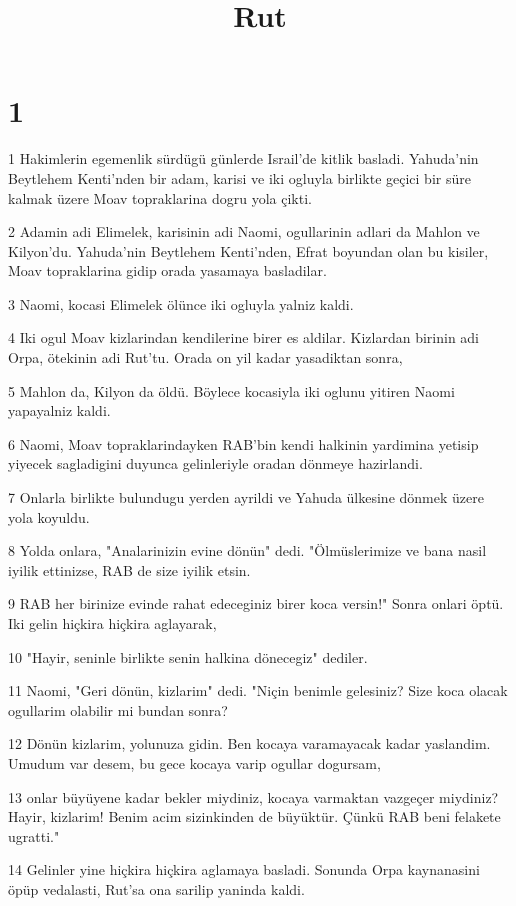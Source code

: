 

\title{Rut}


\chapter{1}

\par 1 Hakimlerin egemenlik sürdügü günlerde Israil'de kitlik basladi. Yahuda'nin Beytlehem Kenti'nden bir adam, karisi ve iki ogluyla birlikte geçici bir süre kalmak üzere Moav topraklarina dogru yola çikti.
\par 2 Adamin adi Elimelek, karisinin adi Naomi, ogullarinin adlari da Mahlon ve Kilyon'du. Yahuda'nin Beytlehem Kenti'nden, Efrat boyundan olan bu kisiler, Moav topraklarina gidip orada yasamaya basladilar.
\par 3 Naomi, kocasi Elimelek ölünce iki ogluyla yalniz kaldi.
\par 4 Iki ogul Moav kizlarindan kendilerine birer es aldilar. Kizlardan birinin adi Orpa, ötekinin adi Rut'tu. Orada on yil kadar yasadiktan sonra,
\par 5 Mahlon da, Kilyon da öldü. Böylece kocasiyla iki oglunu yitiren Naomi yapayalniz kaldi.
\par 6 Naomi, Moav topraklarindayken RAB'bin kendi halkinin yardimina yetisip yiyecek sagladigini duyunca gelinleriyle oradan dönmeye hazirlandi.
\par 7 Onlarla birlikte bulundugu yerden ayrildi ve Yahuda ülkesine dönmek üzere yola koyuldu.
\par 8 Yolda onlara, "Analarinizin evine dönün" dedi. "Ölmüslerimize ve bana nasil iyilik ettinizse, RAB de size iyilik etsin.
\par 9 RAB her birinize evinde rahat edeceginiz birer koca versin!" Sonra onlari öptü. Iki gelin hiçkira hiçkira aglayarak,
\par 10 "Hayir, seninle birlikte senin halkina dönecegiz" dediler.
\par 11 Naomi, "Geri dönün, kizlarim" dedi. "Niçin benimle gelesiniz? Size koca olacak ogullarim olabilir mi bundan sonra?
\par 12 Dönün kizlarim, yolunuza gidin. Ben kocaya varamayacak kadar yaslandim. Umudum var desem, bu gece kocaya varip ogullar dogursam,
\par 13 onlar büyüyene kadar bekler miydiniz, kocaya varmaktan vazgeçer miydiniz? Hayir, kizlarim! Benim acim sizinkinden de büyüktür. Çünkü RAB beni felakete ugratti."
\par 14 Gelinler yine hiçkira hiçkira aglamaya basladi. Sonunda Orpa kaynanasini öpüp vedalasti, Rut'sa ona sarilip yaninda kaldi.
